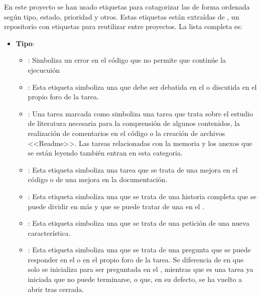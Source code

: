 En este proyecto se han usado etiquetas para catagorizar las  de forma ordenada según tipo, estado, prioridad y otros. Estas etiquetas están extraídas de , un repositorio con etiquetas para reutilizar entre proyectos. La lista completa es:

\begin{itemize}
  \item \textbf{Tipo}:
        \begin{itemize}
          \item \textbf{}: Simboliza un error en el código que no permite que continúe la ejecucuión
          \item \textbf{}: Esta etiqueta simboliza una  que debe ser debatida en el  o discutida en el propio foro de la tarea.
          \item \textbf{}: Una tarea marcada como  simboliza una tarea que trata sobre el estudio de literatura necesaria para la comprensión de algunos contenidos, la realización de comentarios en el código o la creación de archivos <<Readme>>. Las tareas relacionadas con la memoria y los anexos que se están leyendo también entran en esta categoria.
          \item \textbf{}: Esta etiqueta simboliza una tarea que se trata de una mejora en el código o de una mejora en la documentación.
          \item \textbf{}: Esta etiqueta simboliza una  que se trata de una historia completa que se puede dividir en más  y que se puede tratar de una  en el .
          \item \textbf{}: Esta etiqueta simboliza una  que se trata de una petición de una nueva característica.
          \item \textbf{}: Esta etiqueta simboliza una  que se trata de una pregunta que se puede responder en el  o en el propio foro de la tarea. Se diferencia de  en que  solo se inicializa para ser preguntada en el , mientras que  es una tarea ya iniciada que no puede terminarse, o que, en su defecto, se ha vuelto a abrir tras cerrada.
        \end{itemize}


\end{itemize}
